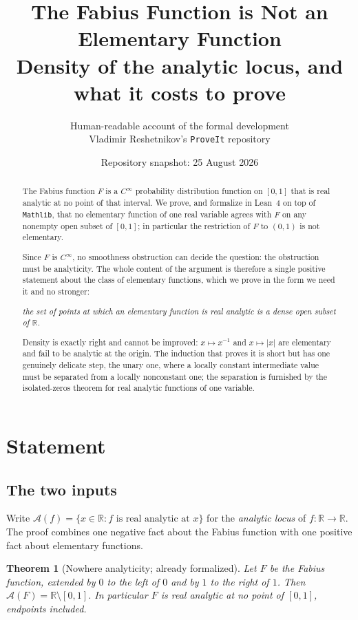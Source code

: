 \documentclass[11pt,oneside]{article}
\title{\bfseries The Fabius Function is Not an Elementary Function\\[0.35em]
\large Density of the analytic locus, and what it costs to prove}
\author{Human-readable account of the formal development\\
\small Vladimir Reshetnikov's \texttt{ProveIt} repository}
\date{Repository snapshot: 25 August 2026}
\newtheorem{theorem}{Theorem}[section]
\theoremstyle{definition}
\theoremstyle{remark}
\newcommand{\R}{\mathbb R}
\newcommand{\An}{\mathcal A}
\begin{document}
\maketitle

\begin{abstract}
The Fabius function $F$ is a $C^\infty$ probability distribution function on
$[0,1]$ that is real analytic at no point of that interval.  We prove, and
formalize in Lean~4 on top of \texttt{Mathlib}, that no elementary function of
one real variable agrees with $F$ on any nonempty open subset of $[0,1]$; in
particular the restriction of $F$ to $(0,1)$ is not elementary.

Since $F$ is $C^\infty$, no smoothness obstruction can decide the question:
the obstruction must be analyticity.  The whole content of the argument is
therefore a single positive statement about the class of elementary functions,
which we prove in the form we need it and no stronger:

\begin{center}
\emph{the set of points at which an elementary function is real analytic is a
dense open subset of $\R$.}
\end{center}

Density is exactly right and cannot be improved: $x\mapsto x^{-1}$ and
$x\mapsto |x|$ are elementary and fail to be analytic at the origin.  The
induction that proves it is short but has one genuinely delicate step, the
unary one, where a locally constant intermediate value must be separated from
a locally nonconstant one; the separation is furnished by the isolated-zeros
theorem for real analytic functions of one variable.
\end{abstract}

\tableofcontents

\section{Statement}

\subsection{The two inputs}

Write $\An(f)=\{x\in\R : f \text{ is real analytic at } x\}$ for the
\emph{analytic locus} of $f\colon\R\to\R$.  The proof combines one negative
fact about the Fabius function with one positive fact about elementary
functions.

\begin{theorem}[Nowhere analyticity; already formalized]\label{thm:nowhere}
Let $F$ be the Fabius function, extended by $0$ to the left of $0$ and by $1$
to the right of $1$.  Then $\An(F)=\R\setminus[0,1]$.  In particular $F$ is
real analytic at no point of $[0,1]$, endpoints included.
\end{theorem}
\end{document}
